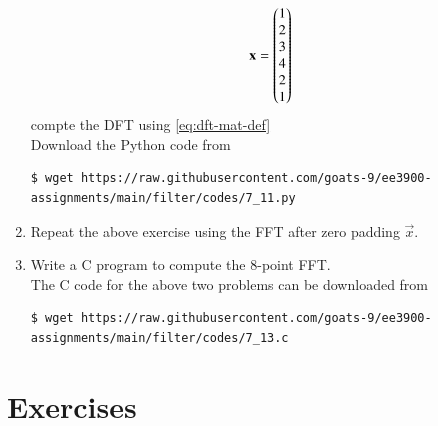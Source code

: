\documentclass[journal,12pt,twocolumn]{IEEEtran}
\renewcommand\thesection{\arabic{section}}
\begin{document}
\begin{enumerate}[label=\arabic*.,ref=\thesection.\theenumi]
    \begin{align}
	    \mathbf{x} = \begin{pmatrix}1\\2\\3\\4\\2\\1\end{pmatrix}
        \label{eq:equation1}
    \end{align}
    compte the DFT  
		using 
	    \eqref{eq:dft-mat-def}\\
\solution Download the Python code from 
\begin{lstlisting}
$ wget https://raw.githubusercontent.com/goats-9/ee3900-assignments/main/filter/codes/7_11.py
\end{lstlisting}
    \item Repeat the above exercise using the FFT
	    after zero padding $\vec{x}$.
\item Write a C program to compute the 8-point FFT. \\
\solution The C code for the above two problems can be downloaded from
\begin{lstlisting}
$ wget https://raw.githubusercontent.com/goats-9/ee3900-assignments/main/filter/codes/7_13.c
\end{lstlisting}
\end{enumerate}
%
\section{Exercises}
\end{document}
